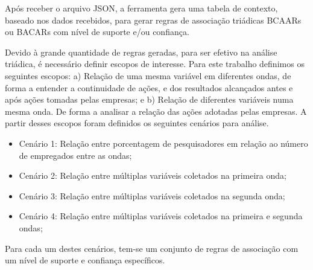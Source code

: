 \documentclass[kdmile,a4paper]{kdmile} %
\begin{document}
Após receber o arquivo JSON, a ferramenta gera uma tabela de contexto, baseado nos dados recebidos, para gerar regras de associação triádicas BCAARs ou BACARs com nível de suporte e/ou confiança.


Devido à grande quantidade de regras geradas, para ser efetivo na análise triádica, é necessário definir escopos de interesse. Para este trabalho definimos os seguintes escopos: a) Relação de uma mesma variável em diferentes ondas, de forma a entender a continuidade de ações, e dos resultados alcançados antes e após ações tomadas pelas empresas; e b) Relação de diferentes variáveis numa mesma onda. De forma a analisar a relação das ações adotadas pelas empresas. A partir desses escopos foram definidos os seguintes cenários para análise.


\begin{itemize}
    \item Cenário 1: Relação entre porcentagem de pesquisadores em relação ao número de empregados entre as ondas;
    \item Cenário 2: Relação entre múltiplas variáveis coletados na primeira onda;
    \item Cenário 3: Relação entre múltiplas variáveis coletados na segunda onda;
    \item Cenário 4: Relação entre múltiplas variáveis coletados na primeira e segunda ondas;
\end{itemize}

Para cada um destes cenários, tem-se um conjunto de regras de associação com um nível de suporte e confiança específicos.

\end{document}
